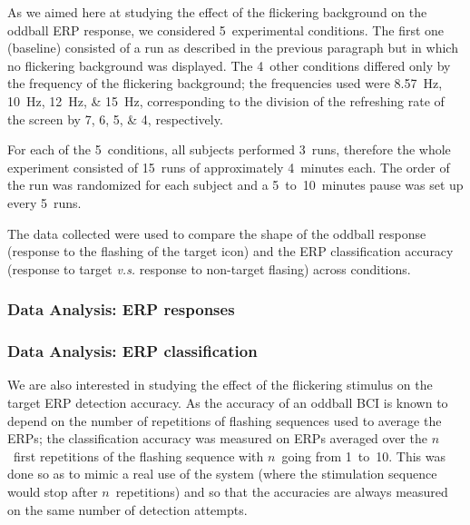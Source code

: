 \documentclass[10pt]{article}
\begin{document}
        As we aimed here at studying the effect of the flickering background on the oddball \ac{ERP} response, we considered 5~experimental conditions.
        The first one (baseline) consisted of a run as described in the previous paragraph but in which no flickering background was displayed.
        The 4~other conditions differed only by the frequency of the flickering background; the frequencies used were \SIlist[list-units = single]{8.57;10;12;15}{\Hz}, corresponding to the division of the refreshing rate of the screen by \numlist{7;6;5;4}, respectively.

        For each of the 5~conditions, all subjects performed 3~runs, therefore the whole experiment consisted of 15~runs of approximately 4~minutes each.
        The order of the run was randomized for each subject and a 5~to~10~minutes pause was set up every 5~runs.

        The data collected were used to compare the shape of the oddball response (response to the flashing of the target icon) and the \ac{ERP} classification accuracy (response to target \emph{v.s.} response to non-target flasing) across conditions.

        \subsubsection{Data Analysis: \acs{ERP} responses}
        \label{sec:2.2.2AnalysisErpShape}



        \subsubsection{Data Analysis: \acs{ERP} classification}
        \label{sec:2.2.3AnalysisErpClassification}

        We are also interested in studying the effect of the flickering stimulus on the target \ac{ERP} detection accuracy.
        As the accuracy of an oddball \ac{BCI} is known to depend on the number of repetitions of flashing sequences used to average the \acp{ERP}; the classification accuracy was measured on \acp{ERP} averaged over the $n$~first repetitions of the flashing sequence with $n$~going from 1~to~10.
        This was done so as to mimic a real use of the system (where the stimulation sequence would stop after $n$~repetitions) and so that the accuracies are always measured on the same number of detection attempts.
        
\end{document}
